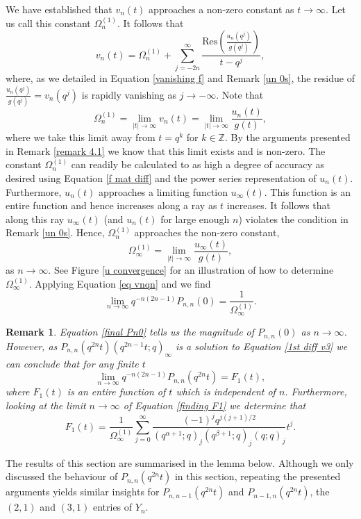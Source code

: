 \documentclass[a4paper,reqno]{amsart}
\numberwithin{equation}{section}
\newtheorem{remark}[theorem]{Remark}
\numberwithin{figure}{section}
\begin{document}
We have established that $v_n(t)$ approaches a non-zero constant as $t\to\infty$. Let us call this constant $\Omega_n^{(1)}$. It follows that
\[ v_n(t) = \Omega_n^{(1)} + \sum_{j=-2n}^{\infty} \frac{\text{Res}\left( \frac{u_n(q^j)}{g(q^j)} \right)}{t-q^{j}} ,\]
where, as we detailed in Equation \eqref{vanishing f} and Remark \ref{un 0s}, the residue of $\frac{u_n(q^j)}{g(q^j)} = v_n(q^j)$ is  rapidly vanishing as $j \to-\infty$. Note that
\begin{equation}\nonumber
    \Omega_n^{(1)} = \lim_{|t|\to\infty} v_{n}(t) = \lim_{|t|\to\infty} \frac{u_n(t)}{g(t)} ,
\end{equation}
where we take this limit away from $t=q^k$ for $k\in\mathbb{Z}$. By the arguments presented in Remark \ref{remark 4.1} we know that this limit exists and is non-zero. The constant $\Omega_n^{(1)}$ can readily be calculated to as high a degree of accuracy as desired using Equation \eqref{f mat diff} and the power series representation of $u_n(t)$. Furthermore, $u_n(t)$ approaches a limiting function $u_\infty(t)$. This function is an entire function and hence increases along a ray as $t$ increases. It follows that along this ray $u_\infty(t)$ (and $u_n(t)$ for large enough $n$) violates the condition in Remark \ref{un 0s}. Hence, $\Omega_n^{(1)}$ approaches the non-zero constant, 
\begin{equation}\label{omega 1 def}
    \Omega^{(1)}_\infty = \lim_{|t|\to\infty}\frac{u_\infty(t)}{g(t)},
\end{equation}
as $n\to\infty$. See Figure \ref{u convergence} for an illustration of how to determine $\Omega^{(1)}_\infty$. Applying Equation \eqref{eq vnqn} and \cite[Thereom 4]{postelmans2005multiple} we find
\begin{equation}\label{final Pn0}
    \lim_{n\to\infty} q^{-n(2n-1)}P_{n,n}(0) = \frac{1}{\Omega^{(1)}_\infty}.
\end{equation}
\begin{remark}
    Equation \eqref{final Pn0} tells us the magnitude of $P_{n,n}(0)$ as $n\to\infty$. However, as $P_{n,n}(q^{2n}t)(q^{2n-1}t;q)_\infty$ is a solution to Equation \eqref{1st diff v3} we can conclude that for any finite $t$ \[\lim_{n\to\infty} q^{-n(2n-1)}P_{n,n}(q^{2n}t) = F_1(t) ,\] 
    where $F_1(t)$ is an entire function of $t$ which is independent of $n$. Furthermore, looking at the limit $n\to\infty$ of Equation \eqref{finding F1} we determine that
    \[ F_1(t) = \frac{1}{\Omega^{(1)}_\infty}\sum_{j=0}^\infty \frac{(-1)^jq^{j(j+1)/2}}{(q^{\alpha+1};q)_j(q^{\beta+1};q)_j(q;q)_j}t^j.\]
\end{remark}
The results of this section are summarised in the lemma below. Although we only discussed the behaviour of $P_{n,n}(q^{2n}t)$ in this section, repeating the presented arguments yields similar insights for $P_{n,n-1}(q^{2n}t)$ and $P_{n-1,n}(q^{2n}t)$, the $(2,1)$ and $(3,1)$ entries of $Y_n$.
\end{document}

